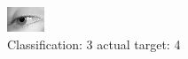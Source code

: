\begin{figure}[h!]
\begin{center}
\includegraphics[width=0.60\columnwidth]{figures/ID3038_class_3_target_4.png}
\end{center}
\caption{ Classification: 3 actual target: 4}
\label{fig:ID3038_class_3_target_4}
\end{figure}
